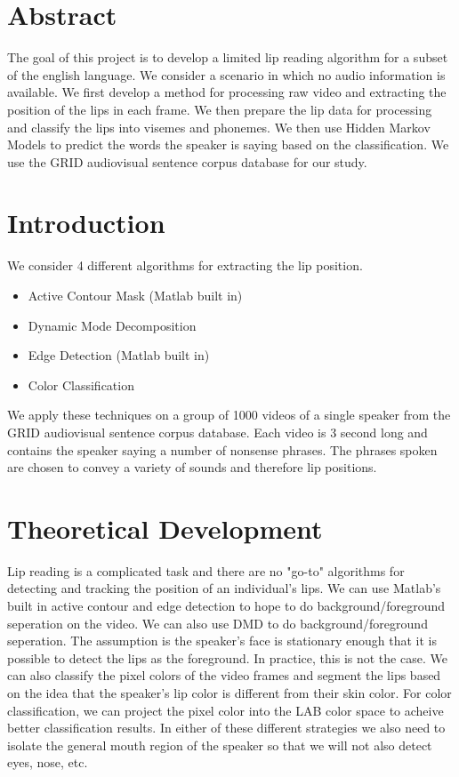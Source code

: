 \documentclass{article}
\begin{document}
\section*{Abstract}
The goal of this project is to develop a limited lip reading algorithm for a subset of the english language. We consider a scenario in which no audio information is available. We first develop a method for processing raw video and extracting the position of the lips in each frame. We then prepare the lip data for processing and classify the lips into visemes and phonemes. We then use Hidden Markov Models to predict the words the speaker is saying based on  the classification. We use the GRID audiovisual sentence corpus database for our study. 

\section{Introduction}
We consider 4 different algorithms for extracting the lip position. \begin{itemize}
  \item Active Contour Mask (Matlab built in)
\item Dynamic Mode Decomposition 
\item Edge Detection (Matlab built in)
\item Color Classification
\end{itemize}
We apply these techniques on a group of 1000 videos of a single speaker from the GRID audiovisual sentence corpus database. Each video is 3 second long and contains the speaker saying a number of nonsense phrases. The phrases spoken are chosen to convey a variety of sounds and therefore lip positions.



\section{Theoretical Development}
Lip reading is a complicated task and there are no "go-to" algorithms for detecting and tracking the position of an individual's lips. We can use Matlab's built in active contour and edge detection to hope to do background/foreground seperation on the video. We can also use DMD to do background/foreground seperation. The assumption is the speaker's face is stationary enough that it is possible to detect the lips as the foreground. In practice, this is not the case. We can also classify the pixel colors of the video frames and segment the lips based on the idea that the speaker's lip color is different from their skin color. For color classification, we can project the pixel color into the LAB color space to acheive better classification results. In either of these different strategies we also need to isolate the general mouth region of the speaker so that we will not also detect eyes, nose, etc. 
\end{document}

